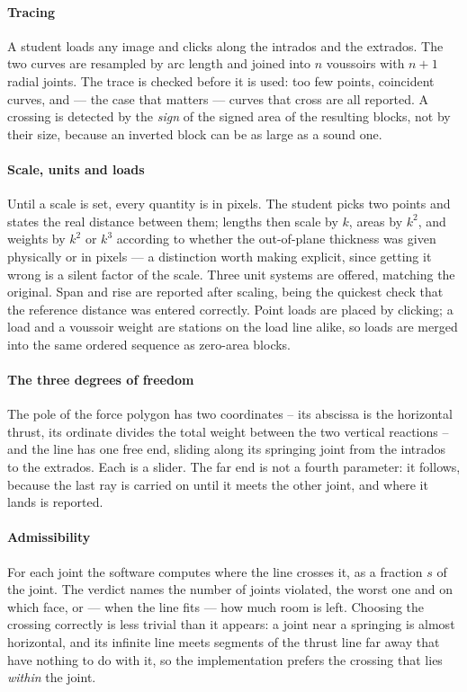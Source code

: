 \documentclass[final,3p,times,twocolumn]{elsarticle}
\begin{document}
\paragraph{Tracing} A student loads any image and clicks along the intrados and
the extrados. The two curves are resampled by arc length and joined into $n$
voussoirs with $n+1$ radial joints. The trace is checked before it is used: too
few points, coincident curves, and --- the case that matters --- curves that
cross are all reported. A crossing is detected by the \emph{sign} of the signed
area of the resulting blocks, not by their size, because an inverted block can
be as large as a sound one.

\paragraph{Scale, units and loads} Until a scale is set, every quantity is in
pixels. The student picks two points and states the real distance between them;
lengths then scale by $k$, areas by $k^2$, and weights by $k^2$ or $k^3$
according to whether the out-of-plane thickness was given physically or in
pixels --- a distinction worth making explicit, since getting it wrong is a
silent factor of the scale. Three unit systems are offered, matching the
original. Span and rise are reported after scaling, being the quickest check
that the reference distance was entered correctly. Point loads are placed by
clicking; a load and a voussoir weight are stations on the load line alike, so
loads are merged into the same ordered sequence as zero-area blocks.

\paragraph{The three degrees of freedom} The pole of the force polygon has two
coordinates -- its abscissa is the horizontal thrust, its ordinate divides the
total weight between the two vertical reactions -- and the line has one free
end, sliding along its springing joint from the intrados to the extrados. Each
is a slider. The far end is not a fourth parameter: it follows, because the
last ray is carried on until it meets the other joint, and where it lands is
reported.

\paragraph{Admissibility} For each joint the software computes where the line
crosses it, as a fraction $s$ of the joint. The verdict names the number of
joints violated, the worst one and on which face, or --- when the line fits ---
how much room is left. Choosing the crossing correctly is less trivial than it
appears: a joint near a springing is almost horizontal, and its infinite line
meets segments of the thrust line far away that have nothing to do with it, so
the implementation prefers the crossing that lies \emph{within} the joint.
\end{document}
